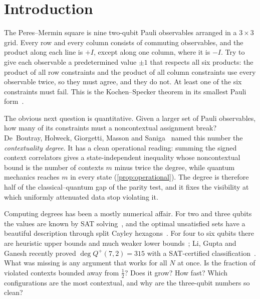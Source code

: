 \documentclass[a4paper,onecolumn,11pt,unpublished,nopdfoutputerror]{quantumarticle}
\theoremstyle{definition}
\renewcommand{\deg}{\operatorname{deg}}
\newcommand{\Qp}[1]{Q^{+}(#1,2)}
\begin{document}
\tableofcontents

\section{Introduction}\label{sec:intro}

The Peres--Mermin square is nine two-qubit Pauli observables arranged in a $3\times3$ grid. Every row and every
column consists of commuting observables, and the product along each line is $+I$, except along one column,
where it is $-I$. Try to give each observable a predetermined value $\pm1$ that respects all six products: the
product of all row constraints and the product of all column constraints use every observable twice, so they
must agree, and they do not. At least one of the six constraints must fail. This is the Kochen--Specker theorem
in its smallest Pauli form~\cite{KochenSpecker1967,Peres1990,Mermin1990}.

The obvious next question is quantitative. Given a larger set of Pauli observables, how many of its constraints
must a noncontextual assignment break? De~Boutray, Holweck, Giorgetti, Masson and Saniga~\cite{deBoutray2022}
named this number the \emph{contextuality degree}. It has a clean operational reading: summing the signed context
correlators gives a state-independent inequality whose noncontextual bound is the number of contexts $m$ minus
twice the degree, while quantum mechanics reaches $m$ in every state (\cref{prop:operational}). The degree is
therefore half of the classical--quantum gap of the parity test, and it fixes the visibility at which uniformly
attenuated data stop violating it.

Computing degrees has been a mostly numerical affair. For two and three qubits the values are known by SAT
solving~\cite{deBoutray2022,Muller2024}, and the optimal unsatisfied sets have a beautiful description through
split Cayley hexagons~\cite{Saniga2023}. For four to six qubits there are heuristic upper bounds and much weaker
lower bounds~\cite{Muller2024heur}; Li, Gupta and Ganesh recently proved $\deg\Qp7=315$ with a SAT-certified
classification~\cite{LiGuptaGanesh2026}. What was missing is any argument that works for all $N$ at once. Is the
fraction of violated contexts bounded away from $\tfrac12$? Does it grow? How fast? Which configurations are the
most contextual, and why are the three-qubit numbers so clean?
\end{document}
